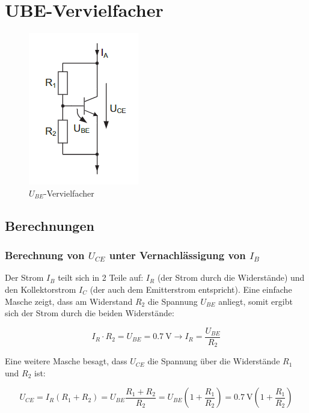 \chapter{UBE-Vervielfacher}

\begin{figure}[H]
    \centering
    \includegraphics{tex/6_UBE-Vervielfacher/pictures/UBE_Schaltung.png}
    \caption{$U_{BE}$-Vervielfacher}
    \label{fig:my_label}
\end{figure}

\section{Berechnungen}

\subsection{Berechnung von $U_{CE}$ unter Vernachlässigung von $I_B$}

Der Strom $I_B$ teilt sich in 2 Teile auf: $I_R$ (der Strom durch die Widerstände) und den Kollektorstrom $I_C$ (der auch dem Emitterstrom entspricht). Eine einfache Masche zeigt, dass am Widerstand $R_2$ die Spannung $U_{BE}$ anliegt, somit ergibt sich der Strom durch die beiden Widerstände:

\begin{equation*}
    I_R \cdot R_2 = U_{BE} = \SI{0.7}{\volt} \rightarrow I_R = \frac{U_{BE}}{R_2}
\end{equation*}

Eine weitere Masche besagt, dass $U_{CE}$ die Spannung über die Widerstände $R_1$ und $R_2$ ist:

\begin{equation*}
    U_{CE} = I_R \left( R_1 + R_2 \right) = U_{BE} \frac{R_1 + R_2}{R_2} = U_{BE} \left( 1 + \frac{R_1}{R_2} \right) = \SI{0.7}{\volt} \left( 1 + \frac{R_1}{R_2} \right)
\end{equation*}

